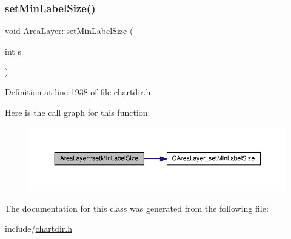 \subsubsection{\texorpdfstring{set\+Min\+Label\+Size()}{setMinLabelSize()}}
{\footnotesize\ttfamily void Area\+Layer\+::set\+Min\+Label\+Size (\begin{DoxyParamCaption}\item[{int}]{s }\end{DoxyParamCaption})\hspace{0.3cm}{\ttfamily [inline]}}



Definition at line 1938 of file chartdir.\+h.

Here is the call graph for this function\+:
\nopagebreak
\begin{figure}[H]
\begin{center}
\leavevmode
\includegraphics[width=350pt]{class_area_layer_a5db68f656bcb69c9064e4553de75f0f7_cgraph}
\end{center}
\end{figure}


The documentation for this class was generated from the following file\+:\begin{DoxyCompactItemize}
\item 
include/\hyperlink{chartdir_8h}{chartdir.\+h}\end{DoxyCompactItemize}
